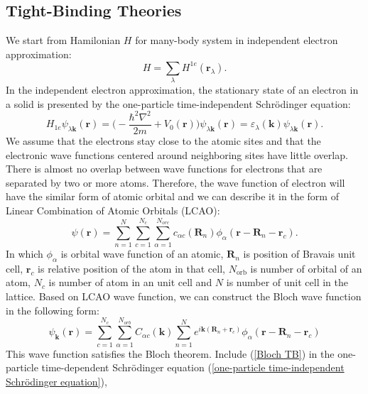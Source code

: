 \documentclass[12pt,english,a4paper]{article}
\begin{document}
	\subsection{Tight-Binding Theories}
	\quad We start from Hamilonian $H$ for many-body system in independent electron approximation:
	\begin{equation}
		H =\sum_{\lambda} H^{1e} (\textbf{r}_\lambda).
	\end{equation}
	In the independent electron approximation, the stationary state of an electron in a solid is presented by the one-particle time-independent Schrödinger equation:
	\begin{equation}
		\label{one-particle time-independent Schrödinger equation}
		H_{1e} \psi_{\lambda\textbf{k}}( \textbf{r}) = \bigg(-\frac{\hbar^2 \nabla^2}{2m} + V_0 (\textbf{r})\bigg) \psi_{\lambda \textbf{k}}(\textbf{r}) = \varepsilon_{\lambda}(\textbf{k})\psi_{\lambda \textbf{k}}(\textbf{r}).
	\end{equation}
	\quad We assume that the electrons stay close to the atomic sites and that the electronic wave functions centered around neighboring sites have little overlap. There is almost no overlap between wave functions for electrons that are separated by two or more atoms. Therefore, the wave function of electron will have the similar form of atomic orbital and we can describe it in the form of Linear Combination of Atomic Orbitals (LCAO):
	\begin{equation}
		\psi(\textbf{r}) = \sum_{n=1}^N \sum_{c=1}^{N_c}\sum_{\alpha = 1}^{N_{orc}}c_{\alpha c}(\textbf{R}_n) \phi_\alpha(\textbf{r} -\textbf{R}_n- \textbf{r}_c).
	\end{equation}
	In which $\phi_\alpha$ is orbital wave function of an atomic, $\textbf{R}_n$ is position of Bravais unit cell, $\textbf{r}_c$ is relative position of the atom in that cell, $N_{\mathrm{orb}}$ is number of orbital of an atom, $N_c$ is number of atom in an unit cell and $N$ is number of unit cell in the lattice. Based on LCAO wave function, we can construct the Bloch wave function in the following form:
	\begin{equation}
		\label{Bloch TB}
		\psi_{\textbf{k}} (\textbf{r}) = \sum_{c=1}^{N_c} \sum_{\alpha = 1}^{N_{orb}} C_{\alpha c} (\textbf{k}) \sum_{n=1}^N e^{i\textbf{k}(\textbf{R}_n +\textbf{r}_c)} \phi_{\alpha}(\textbf{r} -\textbf{R}_n -\textbf{r}_c)
	\end{equation}
	\quad This wave function satisfies the Bloch theorem. Include (\ref{Bloch TB}) in the one-particle time-dependent Schrödinger equation (\ref{one-particle time-independent Schrödinger equation}),
\end{document}
